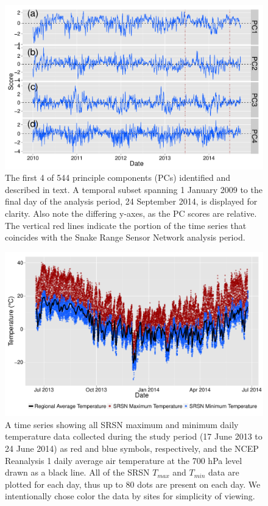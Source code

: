 \documentclass{ametsoc}
\begin{document}
\begin{figure}[ht]

 \centerline{\includegraphics[width=39pc]{figure03_PCs.pdf}}

  \caption{The first 4 of 544 principle components (PCs) identified and described in text.  A temporal subset spanning 1 January 2009 to the final day of the analysis period, 24 September 2014, is displayed for clarity. Also note the differing y-axes, as the PC scores are relative. The vertical red lines indicate the portion of the time series that coincides with the Snake Range Sensor Network analysis period.}\label{fig:3}

\end{figure}


\begin{figure}[ht]

\centerline{\includegraphics[width=39pc]{figure04_raw-t-data.pdf}}

 \caption{A time series showing all SRSN maximum and minimum daily temperature data collected during the study period (17 June 2013 to 24 June 2014) as red and blue symbols, respectively, and the NCEP Reanalysis 1 daily average air temperature at the 700 hPa level drawn as a black line. All of the SRSN $T_{max}$ and $T_{min}$ data are plotted for each day, thus up to 80 dots are present on each day. We intentionally chose color the data by sites for simplicity of viewing.}\label{fig:4}

\end{figure}
\end{document}
